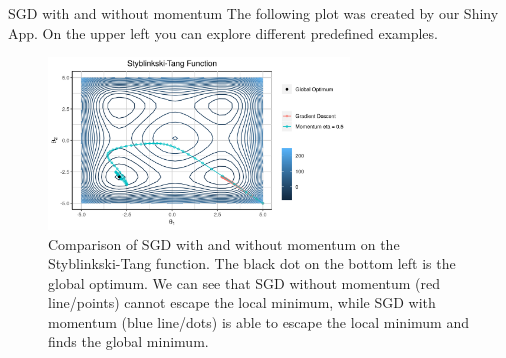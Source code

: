 \begin{vbframe}{SGD with and without momentum}
\footnotesize The following plot was created by our Shiny App. On the upper left you can explore different predefined examples. \href{https://juliambr.shinyapps.io/shinyapp/}{}
\begin{figure}
\vspace{-0.3cm}
  \captionsetup{font=footnotesize,labelfont=footnotesize, labelfont = bf}
  \centering
    \includegraphics[width = 8cm]{plots/momentum2.png}
    \caption{Comparison of SGD with and without momentum on the Styblinkski-Tang function.
    The black dot on the bottom left is the global optimum. We can see that 
    SGD without momentum (red line/points) cannot escape the local minimum, while SGD with momentum (blue line/dots) is able to escape the local minimum and finds the global minimum.}
  \end{figure}
\end{vbframe}

